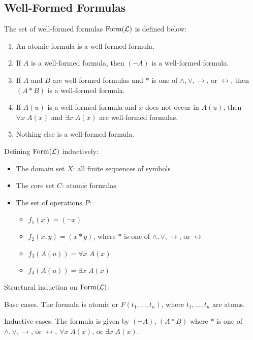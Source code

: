 \documentclass[11pt]{article}
\theoremstyle{definition}
\begin{document}
\subsection{Well-Formed Formulas}
The set of well-formed formulas ${\rm Form}(\mathcal{L})$ is defined below:\vspace{-0.25cm}
\begin{enumerate}
    \item An atomic formula is a well-formed formula.
    \item If $A$ is a well-formed formula, then $(\neg A)$ is a well-formed formula.
    \item If $A$ and $B$ are well-formed formulas and $*$ is one of $\wedge, \vee, \rightarrow$, or $\leftrightarrow$, then $(A * B)$ is a well-formed formula.
    \item If $A(u)$ is a well-formed formula and $x$ does not occur in $A(u)$, then $\forall x \; A(x)$ and $\exists x \; A(x)$ are well-formed formulas.
    \item Nothing else is a well-formed formula.
\end{enumerate}
\vspace{-0.25cm}
\newpage
Defining ${\rm Form}(\mathcal{L})$ inductively:\vspace{-0.25cm}
\begin{itemize}
    \item The domain set $X$: all finite sequences of symbols
    \item The core set $C$: atomic formulas
    \item The set of operations $P$: 
    \begin{itemize}[label={}]
        \item $f_1(x) = (\neg x)$
        \item $f_2(x, y) = (x * y)$, where $*$ is one of $\wedge, \vee, \rightarrow$, or $\leftrightarrow$ 
        \item $f_3(A(u)) = \forall x \; A(x)$
        \item $f_4(A(u)) = \exists x \; A(x)$
    \end{itemize}
\end{itemize}
\vspace{-0.25cm}
Structural induction on ${\rm Form}(\mathcal{L})$:

{\sc Base cases.} The formula is atomic or $F(t_1, \dots, t_n)$, where $t_1, \dots, t_n$ are atoms.

{\sc Inductive cases.} The formula is given by $(\neg A)$, $(A * B)$ where $*$ is one of $\wedge, \vee, \rightarrow$, or $\leftrightarrow$, $\forall x \; A(x)$, or $\exists x \; A(x)$.
\end{document}
